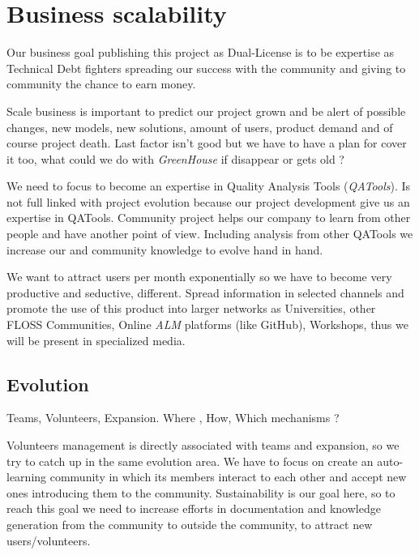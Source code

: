 \documentclass[11pt]{scrartcl}
\begin{document}


\section{Business scalability}
\label{sec:scalability}

\par Our business goal publishing this project as Dual-License is to be expertise as Technical Debt fighters spreading our success with the community and giving to community the chance to earn money.

\par Scale business is important to predict our project grown and be alert of possible changes, new models, new solutions, amount of users, product demand and of course project death. Last factor isn't good but we have to have a plan for cover it too, what could we do with \emph{GreenHouse} if disappear or gets old ? 

\par We need to focus to become an expertise in Quality Analysis Tools (\emph{QATools}). Is not full linked with project evolution because our project development give us an expertise in QATools. Community project helps our company to learn from other people and have another point of view. Including analysis from other QATools we increase our and community knowledge to evolve hand in hand.

\par We want to attract users per month exponentially so we have to become very productive and seductive, different. Spread information in selected channels and promote the use of this product into larger networks as Universities, other FLOSS Communities, Online \emph{ALM} platforms (like GitHub), Workshops, thus we will be present in specialized media.


\subsection{Evolution}
\label{sub:evolution}

\par Teams, Volunteers, Expansion. Where , How, Which mechanisms ?

\par Volunteers management is directly associated with teams and expansion, so we try to catch up in the same evolution area. We have to focus on create an auto-learning community in which its members interact to each other and accept new ones introducing them to the community. Sustainability is our goal here, so to reach this goal we need to increase efforts in documentation and knowledge generation from the community to outside the community, to attract new users/volunteers. 
\end{document}
